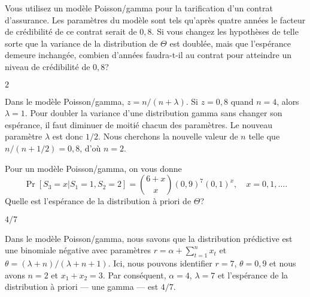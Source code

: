 \begin{exercice}
  Vous utilisez un modèle Poisson/gamma pour la tarification d'un
  contrat d'assurance. Les paramètres du modèle sont tels qu'après
  quatre années le facteur de crédibilité de ce contrat serait de
  $0,8$. Si vous changez les hypothèses de telle sorte que la variance
  de la distribution de $\Theta$ est doublée, mais que l'espérance
  demeure inchangée, combien d'années faudra-t-il au contrat pour
  atteindre un niveau de crédibilité de $0,8$?
  \begin{rep}
    $2$
  \end{rep}
  \begin{sol}
    Dans le modèle Poisson/gamma, $z = n/(n + \lambda)$. Si $z = 0,8$
    quand $n = 4$, alors $\lambda = 1$. Pour doubler la variance d'une
    distribution gamma sans changer son espérance, il faut diminuer de
    moitié chacun des paramètres. Le nouveau paramètre $\lambda$ est
    donc $1/2$. Nous cherchons la nouvelle valeur de $n$ telle que
    $n/(n + 1/2) = 0,8$, d'où $n = 2$.
  \end{sol}
\end{exercice}

\begin{exercice}
  Pour un modèle Poisson/gamma, on vous donne
  \begin{equation*}
    \Pr[S_3 = x | S_1 = 1, S_2 = 2] = \binom{6 + x}{x} (0,9)^7
    (0,1)^x, \quad x = 0, 1, \dots.
  \end{equation*}
  Quelle est l'espérance de la distribution à priori de $\Theta$?
  \begin{rep}
    $4/7$
  \end{rep}
  \begin{sol}
    Dans le modèle Poisson/gamma, nous savons que la distribution
    prédictive est une binomiale négative avec paramètres
    $r = \alpha + \sum_{t=1}^n x_t$ et
    $\theta = (\lambda + n)/(\lambda + n + 1)$. Ici, nous pouvons
    identifier $r = 7$, $\theta = 0,9$ et nous avons $n = 2$ et
    $x_1 + x_2 = 3$. Par conséquent, $\alpha = 4$, $\lambda = 7$ et
    l'espérance de la distribution à priori --- une gamma --- est
    $4/7$.
  \end{sol}
\end{exercice}

